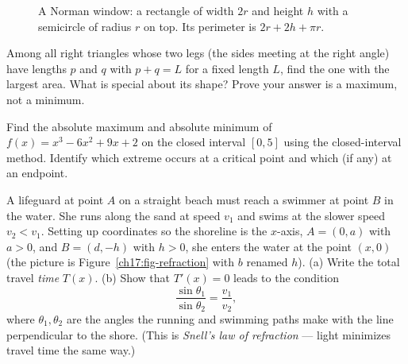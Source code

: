 \begin{figure}[htbp]
\centering
{}
\caption{A Norman window: a rectangle of width $2r$ and height $h$ with a semicircle of
radius $r$ on top. Its perimeter is $2r + 2h + \pi r$.}
\label{ch17:fig-norman}
\end{figure}

\begin{exercise}
Among all right triangles whose two legs (the sides meeting at the right angle) have
lengths $p$ and $q$ with $p+q=L$ for a fixed length $L$, find the one with the largest area. What is special about its shape? Prove your
answer is a maximum, not a minimum.
\end{exercise}

\begin{exercise}
Find the absolute maximum and absolute minimum of $f(x) = x^3 - 6x^2 + 9x + 2$ on the
closed interval $[0,5]$ using the closed-interval method. Identify which extreme
occurs at a critical point and which (if any) at an endpoint.
\end{exercise}

\begin{exercise}
A lifeguard at point $A$ on a straight beach must reach a swimmer at point $B$ in the
water. She runs along the sand at speed $v_1$ and swims at the slower speed $v_2 <
v_1$. Setting up coordinates so the shoreline is the $x$-axis, $A=(0,a)$ with $a>0$, and
$B=(d, -h)$ with $h>0$, she enters the water at the point $(x,0)$ (the picture is
Figure~\ref{ch17:fig-refraction} with $b$ renamed $h$). (a) Write the total
travel \emph{time} $T(x)$. (b) Show that $T'(x)=0$ leads to the condition
\[
\frac{\sin\theta_1}{\sin\theta_2} = \frac{v_1}{v_2},
\]
where $\theta_1,\theta_2$ are
the angles the running and swimming paths make with the line perpendicular to the
shore. (This is \emph{Snell's law of refraction} --- light minimizes travel time the
same way.)
\end{exercise}

